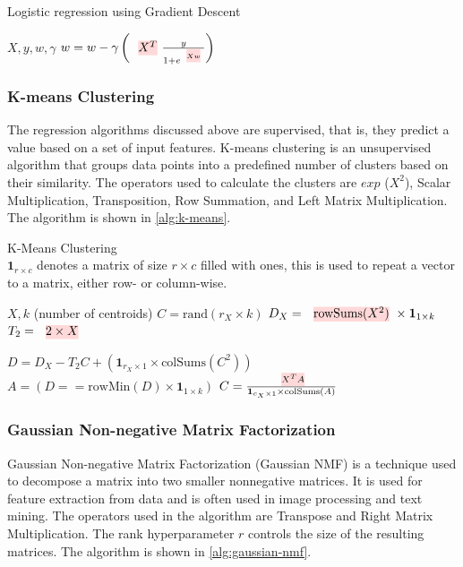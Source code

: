 \begin{algorithm}[ht]
  \caption[Linear regression]{Logistic regression using Gradient Descent
    ~\cite{morpheus}}\label{alg:logistic-regression}
  \begin{algorithmic}
    \Require $X, y , w, \gamma$
    \State $w = w - \gamma \left(\text{\red{$X^T$}} \frac{y}{1+e^{\text{\red{$X w$}}}}\right)$
    \EndFor
  \end{algorithmic}
\end{algorithm}

\subsubsection{K-means Clustering}
The regression algorithms discussed above are supervised, that is, they predict a value based on a set of input features. K-means clustering is an unsupervised algorithm that groups data points into a predefined number of clusters based on their similarity. The operators used to calculate the clusters are $exp$ ($X^2$), Scalar Multiplication, Transposition, Row Summation, and Left Matrix Multiplication. The algorithm is shown in \autoref{alg:k-means}.

\begin{algorithm}[ht]
  \caption[K-Means Clustering]{K-Means Clustering
    ~\cite{morpheus}\\
    $\mathbf{1}_{r \times c}$ denotes a matrix of size $r \times c$ filled with ones, this is used to repeat a vector to a matrix, either row- or column-wise.}\label{alg:k-means}
  \begin{algorithmic}
    \Require $X, k$ (number of centroids)
    \State $C = \text{rand}(r_X \times k)$ 
    \State $D_X = \text{\red{rowSums($X^2$)}} \times \mathbf{1}_{1 \times k}$ 
    \State $T_2 = \text{\red{$2 \times X$}}$

    \State $D = D_X - T_2C + \left( \mathbf{1}_{r_X\times 1} \times \text{colSums}(C^2) \right)$ 
    \State $A = (D == \text{rowMin}(D) \times \mathbf{1}_{1 \times k})$ 
    \State $C =\frac{\text{\red{$X^T A$}}}{\mathbf{1}_{c_X \times 1} \times \text{colSums}(A)}$ 
    \EndFor
  \end{algorithmic}
\end{algorithm}

\subsubsection{Gaussian Non-negative Matrix Factorization}
Gaussian Non-negative Matrix Factorization (Gaussian NMF) is a technique used to decompose a matrix into two smaller nonnegative matrices. It is used for feature extraction from data and is often used in image processing and text mining. The operators used in the algorithm are Transpose and Right Matrix Multiplication. The rank hyperparameter $r$ controls the size of the resulting matrices. The algorithm is shown in \autoref{alg:gaussian-nmf}.

